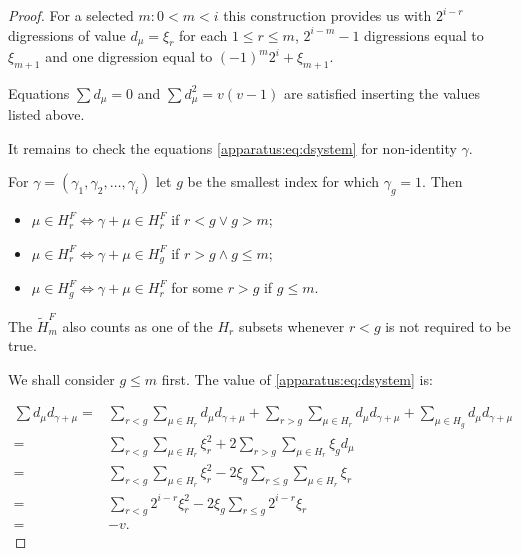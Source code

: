 \begin{proof}
	For a selected $m \colon 0 < m < i$ this construction provides us with $2^{i-r}$ digressions of value $d_\mu=\xi_r$ for each $1 \leq r\leq m$, $2^{i-m}-1$ digressions equal to $\xi_{m+1}$ and one digression equal to $(-1)^m 2^i+\xi_{m+1}$.
    
    Equations $\sum d_\mu = 0$ and $\sum d_\mu^2 = v(v-1)$ are satisfied inserting the values listed above.
    
    It remains to check the equations \eqref{apparatus:eq:dsystem} for non-identity $\gamma$.
    
    For $\gamma = (\gamma_1, \gamma_2, \ldots, \gamma_i)$ let $g$ be the smallest index for which $\gamma_g=1$. Then
    \begin{itemize}
        \item $\mu \in H_r^F \iff \gamma + \mu \in H_r^F$ if $r < g \lor g > m$;
        \item $\mu \in H_r^F \iff \gamma + \mu \in H_g^F$ if $r > g \land g \leq m$;
        \item $\mu \in H_g^F \iff \gamma + \mu \in H_r^F$ for some $r>g$ if $g \leq m$.
    \end{itemize}
    
    The $\widetilde H_m^F$ also counts as one of the $H_r$ subsets whenever $r<g$ is not required to be true.
    
    We shall consider $g\leq m$ first. The value of \eqref{apparatus:eq:dsystem} is:
    
    \begin{equation}
        \begin{split}
            \sum d_\mu d_{\gamma+\mu}
              = & \sum\limits_{r<g} \sum\limits_{\mu \in H_r} d_\mu d_{\gamma + \mu}
                + \sum\limits_{r>g} \sum\limits_{\mu \in H_r} d_\mu d_{\gamma + \mu}
                + \sum\limits_{\mu \in H_g} d_\mu d_{\gamma + \mu} \\
              = & \sum\limits_{r<g} \sum\limits_{\mu \in H_r} \xi_r^2
                + 2\sum\limits_{r>g} \sum\limits_{\mu \in H_r} \xi_g d_\mu \\
              = & \sum\limits_{r<g} \sum\limits_{\mu \in H_r} \xi_r^2
                - 2 \xi_g \sum\limits_{r \leq g} \sum\limits_{\mu \in H_r} \xi_r \\
              = & \sum\limits_{r<g} 2^{i-r} \xi_r^2
                - 2 \xi_g \sum\limits_{r \leq g}  2^{i-r} \xi_r \\
              = & - v.
        \end{split}
    \end{equation}
    

\end{proof}
